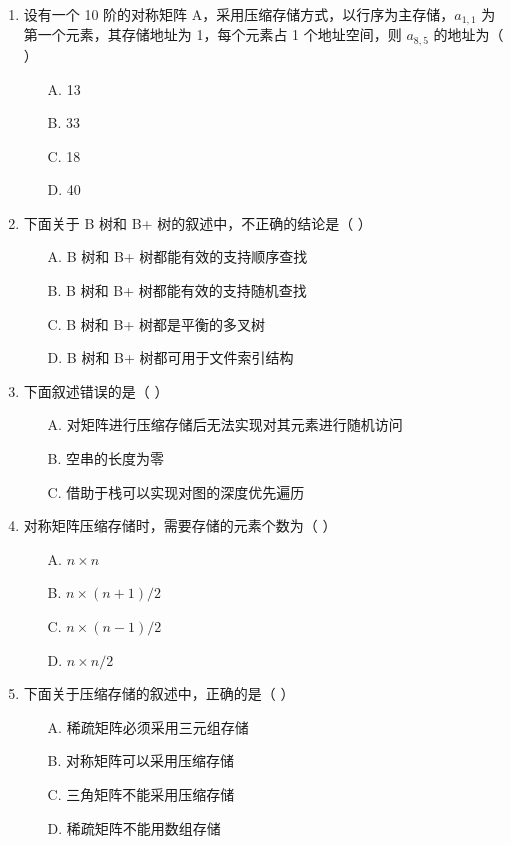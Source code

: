 \documentclass[12pt, a4paper]{article}
\begin{document}
\begin{enumerate}[label=\arabic*.]
	\item 设有一个 10 阶的对称矩阵 A，采用压缩存储方式，以行序为主存储，$a_{1,1}$ 为第一个元素，其存储地址为 1，每个元素占 1 个地址空间，则 $a_{8,5}$ 的地址为（ ）
	      \begin{enumerate}
		      \item[A.] 13
		      \item[B.] 33
		      \item[C.] 18
		      \item[D.] 40
	      \end{enumerate}

	\item 下面关于 B 树和 B+ 树的叙述中，不正确的结论是（ ）
	      \begin{enumerate}
		      \item[A.] B 树和 B+ 树都能有效的支持顺序查找
		      \item[B.] B 树和 B+ 树都能有效的支持随机查找
		      \item[C.] B 树和 B+ 树都是平衡的多叉树
		      \item[D.] B 树和 B+ 树都可用于文件索引结构
	      \end{enumerate}

	\item 下面叙述错误的是（ ）
	      \begin{enumerate}
		      \item[A.] 对矩阵进行压缩存储后无法实现对其元素进行随机访问
		      \item[B.] 空串的长度为零
		      \item[C.] 借助于栈可以实现对图的深度优先遍历
	      \end{enumerate}

	\item 对称矩阵压缩存储时，需要存储的元素个数为（ ）
	      \begin{enumerate}
		      \item[A.] $n \times n$
		      \item[B.] $n \times (n+1) / 2$
		      \item[C.] $n \times (n-1) / 2$
		      \item[D.] $n \times n / 2$
	      \end{enumerate}

	\item 下面关于压缩存储的叙述中，正确的是（ ）
	      \begin{enumerate}
		      \item[A.] 稀疏矩阵必须采用三元组存储
		      \item[B.] 对称矩阵可以采用压缩存储
		      \item[C.] 三角矩阵不能采用压缩存储
		      \item[D.] 稀疏矩阵不能用数组存储
	      \end{enumerate}
\end{enumerate}
\end{document}
